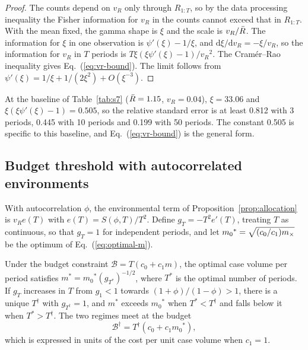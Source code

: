 \begin{proof}
The counts depend on $v_R$ only through $R_{1:T}$, so by the data processing inequality the Fisher information for $v_R$ in the counts cannot exceed that in $R_{1:T}$. With the mean fixed, the gamma shape is $\xi$ and the scale is $v_R/\bar{R}$. The information for $\xi$ in one observation is $\psi'(\xi)-1/\xi$, and $\mathrm{d}\xi/\mathrm{d}v_R=-\xi/v_R$, so the information for $v_R$ in $T$ periods is $T\xi(\xi\psi'(\xi)-1)/v_R{}^2$. The Cram\'er--Rao inequality gives Eq.~(\ref{eq:vr-bound}). The limit follows from $\psi'(\xi)=1/\xi+1/(2\xi^2)+O(\xi^{-3})$.
\end{proof}

At the baseline of Table~\ref{tab:s7} ($\bar{R}=1.15$, $v_R=0.04$), $\xi=33.06$ and $\xi(\xi\psi'(\xi)-1)=0.505$, so the relative standard error is at least 0.812 with 3 periods, 0.445 with 10 periods and 0.199 with 50 periods. The constant 0.505 is specific to this baseline, and Eq.~(\ref{eq:vr-bound}) is the general form.

\subsection{Budget threshold with autocorrelated environments}
\label{app:budget-ar}

With autocorrelation $\phi$, the environmental term of Proposition~\ref{prop:allocation} is $v_Re(T)$ with $e(T)=S(\phi,T)/T^2$. Define $g_T=-T^2e'(T)$, treating $T$ as continuous, so that $g_T=1$ for independent periods, and let $m_0{}^*=\sqrt{(c_0/c_1)m_{\times}}$ be the optimum of Eq.~(\ref{eq:optimal-m}).

\begin{proposition}
\label{prop:budget-ar}
Under the budget constraint $\mathcal{B}=T(c_0+c_1m)$, the optimal case volume per period satisfies $m^*=m_0{}^*(g_{T^*})^{-1/2}$, where $T^*$ is the optimal number of periods. If $g_T$ increases in $T$ from $g_1<1$ towards $(1+\phi)/(1-\phi)>1$, there is a unique $T^\dagger$ with $g_{T^\dagger}=1$, and $m^*$ exceeds $m_0{}^*$ when $T^*<T^\dagger$ and falls below it when $T^*>T^\dagger$. The two regimes meet at the budget
\begin{equation}
  \mathcal{B}^\dagger=T^\dagger\left(c_0+c_1m_0{}^*\right),
  \label{eq:b-dagger}
\end{equation}
which is expressed in units of the cost per unit case volume when $c_1=1$.
\end{proposition}

